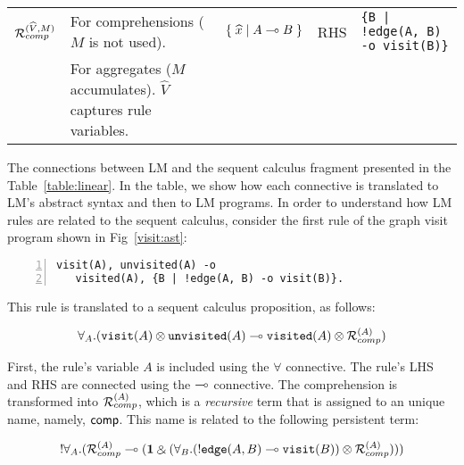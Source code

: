 \begin{table*}
\begin{center}
{\begin{tabular}{ | l | l || l | l | l |}
                                 $\mathcal{R}_{comp}^{(\widehat{V}, M)}$               & For comprehensions
    ($M$ is not used).  & $\{ \; \widehat{x} \; | \; A \multimap B \; \}$  & RHS & \texttt{\{B | !edge(A, B) -o visit(B)\}}        \\
    & For aggregates ($M$ accumulates). $\widehat{V}$ captures rule variables.          &                                               &                 &                                                \\ \hline
    \end{tabular}
}
\end{center}
\caption{Connectives from linear logic and their use in LM.}
\label{table:linear}
\end{table*}

The connections between LM and the sequent calculus fragment presented in the
Table~\ref{table:linear}. In the table, we show how each connective is
translated to LM's abstract syntax and then to LM programs. In order to
understand how LM rules are related to the sequent calculus, consider the first
rule of the graph visit program shown in Fig~\ref{visit:ast}:

\begin{Verbatim}[numbers=left,fontsize=\codesize,commandchars=\*\[\]]
visit(A), unvisited(A) -o
   visited(A), {B | !edge(A, B) -o visit(B)}.
\end{Verbatim}

This rule is translated to a sequent calculus proposition, as follows:

\begin{align}
\forall_A. (\texttt{visit}(A) \otimes \texttt{unvisited}(A) \multimap
   \texttt{visited}(A) \otimes \mathcal{R}_{comp}^{(A)})
\end{align}

First, the rule's variable $A$ is included using the $\forall$ connective. The
rule's LHS and RHS are connected using the $\multimap$ connective. The
comprehension is transformed into $\mathcal{R}_{comp}^{(A)}$, which is a
\emph{recursive} term that is assigned to an unique name, namely, $\mathsf{comp}$.
This name is related to the following persistent term:

\begin{align}
{!} \forall_A. (\mathcal{R}_{comp}^{(A)} \multimap (\mathbf{1} \mathbin{\binampersand}
         (\forall_B. ({!} \texttt{edge}(A, B) \multimap
                                             \texttt{visit}(B)) \otimes
          \mathcal{R}_{comp}^{(A)})))
\end{align}

